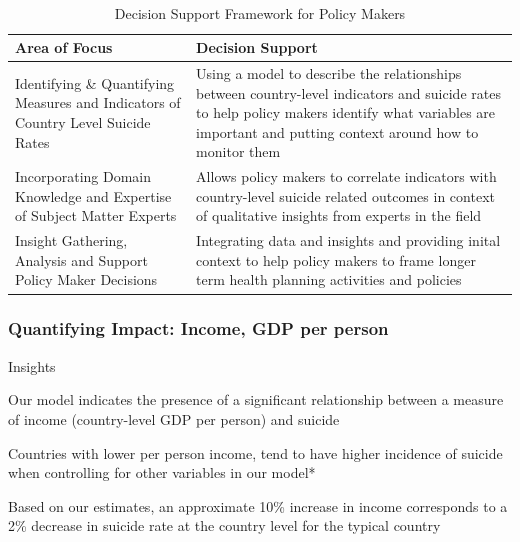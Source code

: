 \documentclass[]{article}
\begin{document}
\begin{table}[H]
\centering 
\caption{Decision Support Framework for Policy Makers}
\
\begin{tabular}{p{5cm}p{10cm}}  
\hline  
   Area of Focus  & Decision Support  \\   
\hline 
 Identifying \& Quantifying Measures and Indicators of Country Level Suicide Rates &  Using a model to describe the relationships between country-level indicators and suicide rates to help policy makers identify what variables are important and putting context around how to monitor them \\   
 \hline 
Incorporating Domain Knowledge and Expertise of Subject Matter Experts & Allows policy makers to correlate indicators with country-level suicide related outcomes in context of qualitative insights from experts in the field \\   
\hline 
Insight Gathering, Analysis and Support Policy Maker Decisions & Integrating data and insights and providing inital context to help policy makers to frame longer term health planning activities and policies \\
\hline 
\end{tabular} 
\end{table}

\subsubsection{Quantifying Impact: Income, GDP per
person}\label{quantifying-impact-income-gdp-per-person}

Insights

Our model indicates the presence of a significant relationship between a
measure of income (country-level GDP per person) and suicide~

Countries with lower per person income, tend to have higher incidence of
suicide when controlling for other variables in our model*

Based on our estimates, an approximate 10\% increase in income
corresponds to a 2\% decrease in suicide rate at the country level for
the typical country
\end{document}
